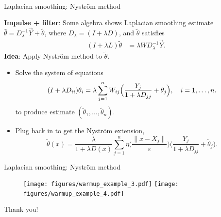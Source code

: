\documentclass[xcolor=dvipsnames]{beamer}
\newcommand{\wh}[1]{\widehat{#1}}
\newcommand{\wt}[1]{\widetilde{#1}}
\begin{document}
\begin{frame}[t]{Laplacian smoothing: Nystr\"{o}m method}

{\bf Impulse + filter}: Some algebra shows Laplacian smoothing estimate $\wh{\theta} = D_{\lambda}^{-1}\vec{Y} + \wt{\theta}$, where $D_{\lambda} = (I + \lambda D)$, and $\wt{\theta}$ satisfies
\begin{equation*}
\begin{aligned}
(I + \lambda L) \wt{\theta} & = \lambda W D_{\lambda}^{-1}\vec{Y}.
\end{aligned}
\end{equation*}
{\bf Idea}: Apply Nystr\"{o}m method to $\wt{\theta}$.
\begin{itemize}
	\item Solve the system of equations
	\begin{equation*}
	(I + \lambda D_{ii})\theta_i = \lambda \sum_{j = 1}^{n} W_{ij}\Bigl(\frac{Y_j}{1 + \lambda D_{jj}} + \theta_j\Bigr), \quad i = 1,\ldots,n.
	\end{equation*}
	to produce estimate $(\wt{\theta}_1,\ldots,\wt{\theta}_n)$.
	\item Plug back in to get the \alert{Nystr\"{o}m extension},
	\begin{equation*}
	\wt{\theta}(x) = \frac{\lambda}{1 + \lambda D(x)}\sum_{j = 1}^{n} \eta\biggl(\frac{\|x - X_j\|}{\varepsilon}\biggr) \biggl(\frac{Y_j}{1 + \lambda D_{jj}} + \wt{\theta}_j\biggr).
	\end{equation*}
\end{itemize}
\end{frame}

\begin{frame}[t]{Laplacian smoothing: Nystr\"{o}m method}
\begin{figure}
	\texttt{[image: figures/warmup\_example\_3.pdf]}
	\texttt{[image: figures/warmup\_example\_4.pdf]}
\end{figure}
\end{frame}

\begin{frame}
\centering
\Huge Thank you!
\end{frame}
\end{document}
